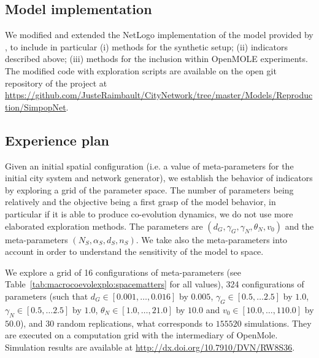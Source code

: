 \subsection{Model implementation}

We modified and extended the NetLogo implementation of the model provided by \cite{schmitt2014modelisation}, to include in particular (i) methods for the synthetic setup; (ii) indicators described above; (iii) methods for the inclusion within OpenMOLE experiments. The modified code with exploration scripts are available on the open git repository of the project at \url{https://github.com/JusteRaimbault/CityNetwork/tree/master/Models/Reproduction/SimpopNet}.



\subsection{Experience plan}

Given an initial spatial configuration (i.e. a value of meta-parameters for the initial city system and network generator), we establish the behavior of indicators by exploring a grid of the parameter space. The number of parameters being relatively and the objective being a first grasp of the model behavior, in particular if it is able to produce co-evolution dynamics, we do not use more elaborated exploration methods. The parameters are $(d_G,\gamma_G,\gamma_N,\theta_N,v_0)$ and the meta-parameters $(N_S,\alpha_S,d_S,n_S)$. We take also the meta-parameters into account in order to understand the sensitivity of the model to space.

We explore a grid of 16 configurations of meta-parameters (see Table~\ref{tab:macrocoevolexplo:spacematters} for all values), 324 configurations of parameters (such that $d_G \in \left[0.001, \ldots , 0.016\right]$ by $0.005$, $\gamma_G \in \left[0.5 , \ldots 2.5\right]$ by $1.0$, $\gamma_N \in \left[0.5 , \ldots 2.5\right]$ by $1.0$, $\theta_N \in \left[1.0 , \ldots , 21.0\right]$ by $10.0$ and $v_0 \in \left[10.0, \ldots , 110.0\right]$ by $50.0$), and 30 random replications, what corresponds to $155520$ simulations. They are executed on a computation grid with the intermediary of OpenMole. Simulation results are available at \url{http://dx.doi.org/10.7910/DVN/RW8S36}.






